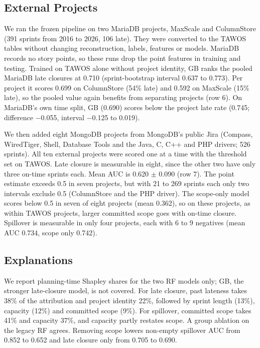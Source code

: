 \documentclass[conference]{IEEEtran}
\begin{document}
\subsection{External Projects}
\label{sec:ext}

We ran the frozen pipeline on two MariaDB projects, MaxScale and ColumnStore (391 sprints from 2016 to 2026, 106 late). They were converted to the TAWOS tables without changing reconstruction, labels, features or models. MariaDB records no story points, so these runs drop the point features in training and testing. Trained on TAWOS alone without project identity, GB ranks the pooled MariaDB late closures at 0.710 (sprint-bootstrap interval 0.637 to 0.773). Per project it scores 0.699 on ColumnStore (54\% late) and 0.592 on MaxScale (15\% late), so the pooled value again benefits from separating projects (row 6). On MariaDB's own time split, GB (0.690) scores below the project late rate (0.745; difference $-$0.055, interval $-$0.125 to 0.019).

We then added eight MongoDB projects from MongoDB's public Jira (Compass, WiredTiger, Shell, Database Tools and the Java, C, C++ and PHP drivers; 526 sprints). All ten external projects were scored one at a time with the threshold set on TAWOS. Late closure is measurable in eight, since the other two have only three on-time sprints each. Mean AUC is 0.620 $\pm$ 0.090 (row 7). The point estimate exceeds 0.5 in seven projects, but with 21 to 269 sprints each only two intervals exclude 0.5 (ColumnStore and the PHP driver). The scope-only model scores below 0.5 in seven of eight projects (mean 0.362), so on these projects, as within TAWOS projects, larger committed scope goes with on-time closure. Spillover is measurable in only four projects, each with 6 to 9 negatives (mean AUC 0.734, scope only 0.742).

\subsection{Explanations}

We report planning-time Shapley shares for the two RF models only; GB, the stronger late-closure model, is not covered. For late closure, past lateness takes 38\% of the attribution and project identity 22\%, followed by sprint length (13\%), capacity (12\%) and committed scope (9\%). For spillover, committed scope takes 41\% and capacity 37\%, and capacity partly restates scope. A group ablation on the legacy RF agrees. Removing scope lowers non-empty spillover AUC from 0.852 to 0.652 and late closure only from 0.705 to 0.690.
\end{document}
